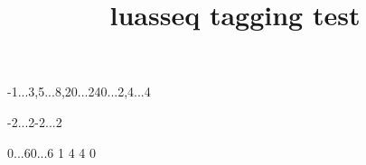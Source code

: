\documentclass{article}
\title{luasseq tagging test}
\begin{document}
\begin{sseq}{-1...3,5...8,20...24}{0...2,4...4}
\end{sseq}

\begin{sseq}[grid=chess,labelstep=1,
entrysize=.8cm]{-2...2}{-2...2}
\ssdropbull
\end{sseq}

\begin{sseq}{0...6}{0...6}
\ssdropbull
{}
 1
\ssdrop{\clubsuit}
\ssdropextension
\ssdropextension
\ssdropextension
{}
 4
 4
\ssdropboxed{\spadesuit}
 0
\ssdropbull
\end{sseq}
\end{document}
